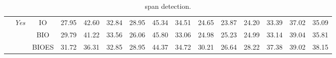 \documentclass[11pt]{article}
\begin{document}
\begin{table*}[htb]
{\begin{tabular}{ccccccccccccccc}
        \cmidrule(lr){2-2} \cmidrule(lr){3-3} \cmidrule(lr){4-9} \cmidrule(lr){10-15}
                                        & \multirow{3}{*}{\textit{Yes}} & IO                                                & 27.95              & 42.60              & 32.84              & 28.95              & 45.34              & 34.51              & 24.65              & 23.87              & 24.20              & 33.39              & 37.02              & 35.09              \\
                                        &                                                & BIO                              & 29.79              & 41.22              & 33.56              & 26.06              & 45.80              & 33.06              & 24.98              & 25.23              & 24.99              & 33.14              & 39.04              & 35.81              \\
                                        &                                                & BIOES                            & 31.72              & 36.31              & 32.85              & 28.95              & 44.37              & 34.72              & 30.21              & 26.64              & 28.22              & 37.38              & 39.02              & 38.15              \\
        \bottomrule
        \end{tabular}
    }
    \caption{span detection.}
    \label{tab:app_span_detection_2}
\end{table*}
\end{document}
